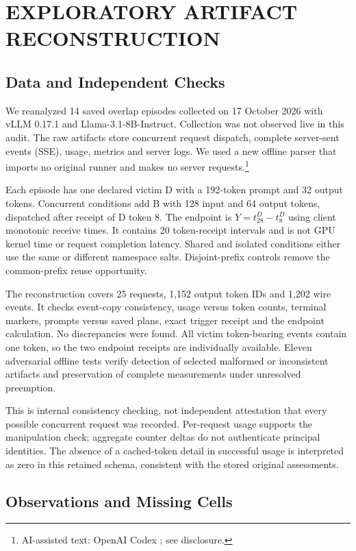 \documentclass[a4paper,twoside]{article}
\newcommand{\aicite}{\footnote{AI-assisted text: OpenAI Codex \cite{codex}; see disclosure.}}
\begin{document}
\section{\uppercase{Exploratory Artifact Reconstruction}}

\subsection{Data and Independent Checks}

We reanalyzed 14 saved overlap episodes collected on 17 October 2026 with vLLM 0.17.1 and Llama-3.1-8B-Instruct. Collection was not observed live in this audit. The raw artifacts store concurrent request dispatch, complete server-sent events (SSE), usage, metrics and server logs. We used a new offline parser that imports no original runner and makes no server requests.\aicite

Each episode has one declared victim D with a 192-token prompt and 32 output tokens. Concurrent conditions add B with 128 input and 64 output tokens, dispatched after receipt of D token 8. The endpoint is $Y=t_{28}^{D}-t_{8}^{D}$ using client monotonic receive times. It contains 20 token-receipt intervals and is not GPU kernel time or request completion latency. Shared and isolated conditions either use the same or different namespace salts. Disjoint-prefix controls remove the common-prefix reuse opportunity.

The reconstruction covers 25 requests, 1,152 output token IDs and 1,202 wire events. It checks event-copy consistency, usage versus token counts, terminal markers, prompts versus saved plans, exact trigger receipt and the endpoint calculation. No discrepancies were found. All victim token-bearing events contain one token, so the two endpoint receipts are individually available. Eleven adversarial offline tests verify detection of selected malformed or inconsistent artifacts and preservation of complete measurements under unresolved preemption.

This is internal consistency checking, not independent attestation that every possible concurrent request was recorded. Per-request usage supports the manipulation check; aggregate counter deltas do not authenticate principal identities. The absence of a cached-token detail in successful usage is interpreted as zero in this retained schema, consistent with the stored original assessments.

\subsection{Observations and Missing Cells}
\end{document}
